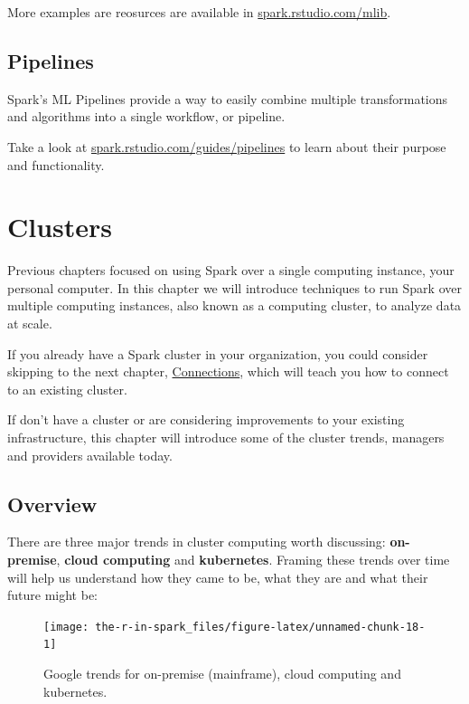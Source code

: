 \documentclass[]{book}
\theoremstyle{definition}
\theoremstyle{definition}
\theoremstyle{definition}
\theoremstyle{remark}
\begin{document}
More examples are reosurces are available in
\href{http://spark.rstudio.com/mlib/}{spark.rstudio.com/mlib}.

\hypertarget{pipelines}{%
\section{Pipelines}\label{pipelines}}

Spark's ML Pipelines provide a way to easily combine multiple
transformations and algorithms into a single workflow, or pipeline.

Take a look at
\href{http://spark.rstudio.com/guides/pipelines/}{spark.rstudio.com/guides/pipelines}
to learn about their purpose and functionality.

\hypertarget{clusters}{%
\chapter{Clusters}\label{clusters}}

Previous chapters focused on using Spark over a single computing
instance, your personal computer. In this chapter we will introduce
techniques to run Spark over multiple computing instances, also known as
a computing cluster, to analyze data at scale.

If you already have a Spark cluster in your organization, you could
consider skipping to the next chapter,
\protect\hyperlink{connections-1}{Connections}, which will teach you how
to connect to an existing cluster.

If don't have a cluster or are considering improvements to your existing
infrastructure, this chapter will introduce some of the cluster trends,
managers and providers available today.

\hypertarget{overview-1}{%
\section{Overview}\label{overview-1}}

There are three major trends in cluster computing worth discussing:
\textbf{on-premise}, \textbf{cloud computing} and \textbf{kubernetes}.
Framing these trends over time will help us understand how they came to
be, what they are and what their future might be:

\begin{figure}

{\centering \texttt{[image: the-r-in-spark\_files/figure-latex/unnamed-chunk-18-1]} 

}

\caption{Google trends for on-premise (mainframe), cloud computing and kubernetes.}\label{fig:unnamed-chunk-18}
\end{figure}
\end{document}
